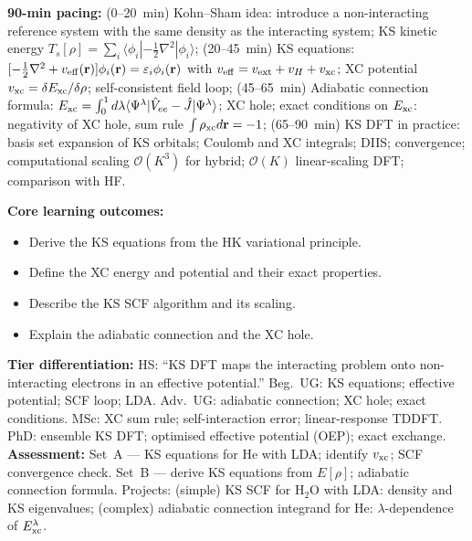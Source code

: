 \documentclass[11pt,a4paper]{article}
\begin{document}
\begin{tcolorbox}[chembox, title={Module~III.3 / L03: Kohn--Sham DFT}]
\textbf{90-min pacing:} (0--20~min) Kohn--Sham idea: introduce a non-interacting reference system with the same density as the interacting system; KS kinetic energy $T_s[\rho]=\sum_i\langle\phi_i|-\tfrac{1}{2}\nabla^2|\phi_i\rangle$; (20--45~min) KS equations: $[-\tfrac{1}{2}\nabla^2+v_{\rm eff}(\mathbf{r})]\phi_i(\mathbf{r})=\varepsilon_i\phi_i(\mathbf{r})$ with $v_{\rm eff}=v_{\rm ext}+v_H+v_{\rm xc}$; XC potential $v_{\rm xc}=\delta E_{\rm xc}/\delta\rho$; self-consistent field loop; (45--65~min) Adiabatic connection formula: $E_{\rm xc}=\int_0^1 d\lambda\langle\Psi^\lambda|\hat{V}_{ee}-\hat{J}|\Psi^\lambda\rangle$; XC hole; exact conditions on $E_{\rm xc}$: negativity of XC hole, sum rule $\int\rho_{\rm xc}d\mathbf{r}=-1$; (65--90~min) KS DFT in practice: basis set expansion of KS orbitals; Coulomb and XC integrals; DIIS; convergence; computational scaling $\mathcal{O}(K^3)$ for hybrid; $\mathcal{O}(K)$ linear-scaling DFT; comparison with HF.

\medskip\textbf{Core learning outcomes:}
\begin{itemize}[leftmargin=1.4em,topsep=2pt,itemsep=1pt]
  \item Derive the KS equations from the HK variational principle.
  \item Define the XC energy and potential and their exact properties.
  \item Describe the KS SCF algorithm and its scaling.
  \item Explain the adiabatic connection and the XC hole.
\end{itemize}
\medskip\textbf{Tier differentiation:}
HS: ``KS DFT maps the interacting problem onto non-interacting electrons in an effective potential.''
Beg.\ UG: KS equations; effective potential; SCF loop; LDA.
Adv.\ UG: adiabatic connection; XC hole; exact conditions.
MSc: XC sum rule; self-interaction error; linear-response TDDFT.
PhD: ensemble KS DFT; optimised effective potential (OEP); exact exchange.
\medskip\textbf{Assessment:}
Set~A --- KS equations for He with LDA; identify $v_{\rm xc}$; SCF convergence check.
Set~B --- derive KS equations from $E[\rho]$; adiabatic connection formula.
Projects: (simple) KS SCF for H$_2$O with LDA: density and KS eigenvalues; (complex) adiabatic connection integrand for He: $\lambda$-dependence of $E_{\rm xc}^\lambda$.
\end{tcolorbox}

\medskip
\end{document}
